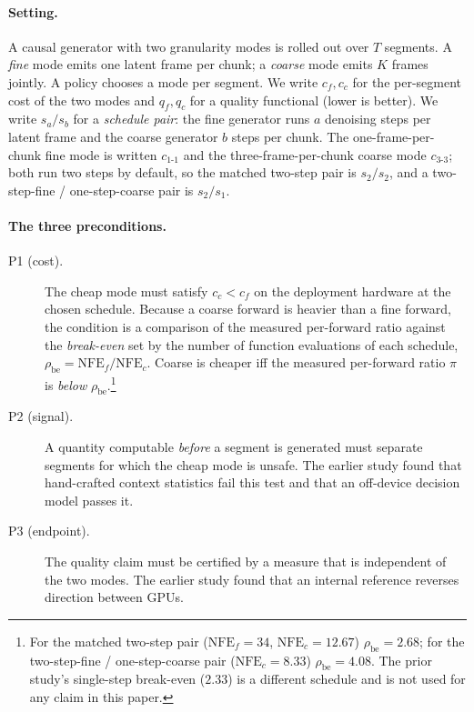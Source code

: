 \documentclass[review]{cas-sc}          %
\begin{document}
\paragraph{Setting.}
A causal generator with two granularity modes is rolled out over $T$ segments. A \emph{fine} mode emits
one latent frame per chunk; a \emph{coarse} mode emits $K$ frames jointly. A policy chooses a mode per
segment. We write $c_f, c_c$ for the per-segment cost of the two modes and $q_f, q_c$ for a quality
functional (lower is better). We write $s_a/s_b$ for a \emph{schedule pair}: the fine generator runs $a$
denoising steps per latent frame and the coarse generator $b$ steps per chunk. The one-frame-per-chunk
fine mode is written $c_{1\text{-}1}$ and the three-frame-per-chunk coarse mode $c_{3\text{-}3}$; both run
two steps by default, so the matched two-step pair is $s_2/s_2$, and a two-step-fine / one-step-coarse
pair is $s_2/s_1$.

\paragraph{The three preconditions.}
\begin{description}
  \item[P1 (cost).] The cheap mode must satisfy $c_c < c_f$ on the deployment hardware at the chosen
  schedule. Because a coarse forward is heavier than a fine forward, the condition is a comparison of the
  measured per-forward ratio against the \emph{break-even} set by the number of function evaluations of
  each schedule, $\rho_\text{be} = \mathrm{NFE}_f / \mathrm{NFE}_c$. Coarse is cheaper iff the measured
  per-forward ratio $\pi$ is \emph{below} $\rho_\text{be}$.\footnote{For the matched two-step pair
  ($\mathrm{NFE}_f = 34$, $\mathrm{NFE}_c = 12.67$) $\rho_\text{be} = 2.68$; for the two-step-fine /
  one-step-coarse pair ($\mathrm{NFE}_c = 8.33$) $\rho_\text{be} = 4.08$. The prior study's single-step
  break-even ($2.33$) is a different schedule and is not used for any claim in this paper.}
  \item[P2 (signal).] A quantity computable \emph{before} a segment is generated must separate segments
  for which the cheap mode is unsafe. The earlier study found that hand-crafted context statistics fail
  this test and that an off-device decision model passes it.
  \item[P3 (endpoint).] The quality claim must be certified by a measure that is independent of the two
  modes. The earlier study found that an internal reference reverses direction between GPUs.
\end{description}
\end{document}
